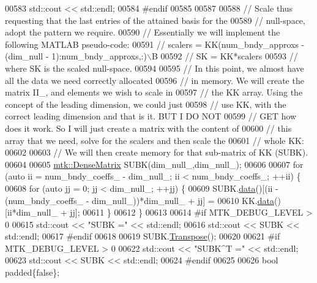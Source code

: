 \begin{DoxyCode}
{{00583   std::cout << std::endl;
00584 \textcolor{preprocessor}{  #endif}
00585 
00587 
00588   \textcolor{comment}{// Scale thus requesting that the last entries of the attained basis for the}
00589   \textcolor{comment}{// null-space, adopt the pattern we require.}
00590   \textcolor{comment}{// Essentially we will implement the following MATLAB pseudo-code:}
00591   \textcolor{comment}{//  scalers = KK(num\_bndy\_approxs - (dim\_null - 1):num\_bndy\_approxs,:)\(\backslash\)B}
00592   \textcolor{comment}{//  SK = KK*scalers}
00593   \textcolor{comment}{// where SK is the scaled null-space.}
00594 
00595   \textcolor{comment}{// In this point, we almost have all the data we need correctly allocated}
00596   \textcolor{comment}{// in memory. We will create the matrix II\_, and elements we wish to scale in}
00597   \textcolor{comment}{// the KK array. Using the concept of the leading dimension, we could just}
00598   \textcolor{comment}{// use KK, with the correct leading dimension and that is it. BUT I DO NOT}
00599   \textcolor{comment}{// GET how does it work. So I will just create a matrix with the content of}
00600   \textcolor{comment}{// this array that we need, solve for the scalers and then scale the}
00601   \textcolor{comment}{// whole KK:}
00602 
00603   \textcolor{comment}{// We will then create memory for that sub-matrix of KK (SUBK).}
00604 
00605   \hyperlink{classmtk_1_1DenseMatrix}{mtk::DenseMatrix} SUBK(dim\_null\_,dim\_null\_);
00606 
00607   \textcolor{keywordflow}{for} (\textcolor{keyword}{auto} ii = num\_bndy\_coeffs\_ - dim\_null\_; ii < num\_bndy\_coeffs\_; ++ii) \{
00608     \textcolor{keywordflow}{for} (\textcolor{keyword}{auto} jj = 0; jj < dim\_null\_; ++jj) \{
00609       SUBK.\hyperlink{classmtk_1_1DenseMatrix_a16b3ff56feb2658b9fc7147d1de4d8e7}{data}()[(ii - (num\_bndy\_coeffs\_ - dim\_null\_))*dim\_null\_ + jj] =
00610           KK.\hyperlink{classmtk_1_1DenseMatrix_a16b3ff56feb2658b9fc7147d1de4d8e7}{data}()[ii*dim\_null\_ + jj];
00611     \}
00612   \}
00613 
00614 \textcolor{preprocessor}{  #if MTK\_DEBUG\_LEVEL > 0}
00615   std::cout << \textcolor{stringliteral}{"SUBK ="} << std::endl;
00616   std::cout << SUBK << std::endl;
00617 \textcolor{preprocessor}{  #endif}
00618 
00619   SUBK.\hyperlink{classmtk_1_1DenseMatrix_a71d9c07ca66e88d97d1fd5012f43138b}{Transpose}();
00620 
00621 \textcolor{preprocessor}{  #if MTK\_DEBUG\_LEVEL > 0}
00622   std::cout << \textcolor{stringliteral}{"SUBK^T ="} << std::endl;
00623   std::cout << SUBK << std::endl;
00624 \textcolor{preprocessor}{  #endif}
00625 
00626   \textcolor{keywordtype}{bool} padded\{\textcolor{keyword}{false}\};
}}
\end{DoxyCode}
